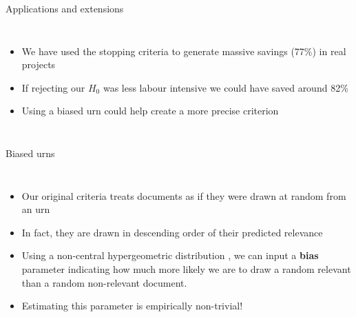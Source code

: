\documentclass[9pt,aspectratio=169]{beamer}
\begin{document}
\begin{frame}{Applications and extensions}
\begin{columns}
		
		
		\small
		
		\begin{itemize}
			\item<1-> We have used the stopping criteria to generate massive savings (77\%) in real projects
			\item<2-> If rejecting our $H_0$ was less labour intensive we could have saved around 82\%
			\item<3-> Using a biased urn could help create a more precise criterion
		\end{itemize}
		
	\end{columns}
	
\end{frame}	

\begin{frame}{Biased urns}
	
	\begin{columns}
		
		
		
		\small
		
		\begin{itemize}
			\item<1-> Our original criteria treats documents as if they were drawn at random from an urn
			\item<2-> In fact, they are drawn in descending order of their predicted relevance
			\item<3-> Using a non-central hypergeometric distribution \citep{fog_calculation_2008}, we can input a \textbf{bias} parameter indicating how much more likely we are to draw a random relevant than a random non-relevant document.
			\item<4-> Estimating this parameter is empirically non-trivial!
		\end{itemize}
		
	\end{columns}
	
\end{frame}	
\end{document}
